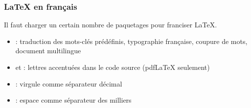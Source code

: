 \begin{frame}[fragile]
  \frametitle{{\LaTeX} en français}

  Il faut charger un certain nombre de paquetages pour franciser \LaTeX.

  \begin{itemize}
  \item {}: traduction des mots-clés prédéfinis,
    typographie française, coupure de mots, document multilingue
  \item {} et : lettres accentuées dans le
    code source (pdf{\LaTeX} seulement)
  \item {}: virgule comme séparateur décimal
  \item {}: espace comme séparateur des milliers
  \end{itemize}
\end{frame}

